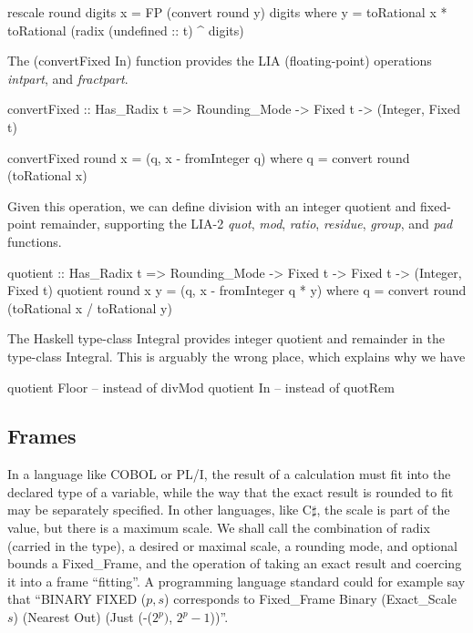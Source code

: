 \documentclass{article}
\begin{document}
\begin{code}
\begin{code}
rescale round digits x = FP (convert round y) digits
  where y = toRational x * toRational (radix (undefined :: t) ^ digits)
\end{code}

The (convertFixed In) function provides the
LIA (floating-point) operations {\it intpart}, and {\it fractpart}.

\begin{code}
convertFixed :: Has_Radix t =>
    Rounding_Mode -> Fixed t -> (Integer, Fixed t)

convertFixed round x = (q, x - fromInteger q)
  where q = convert round (toRational x)
\end{code}

Given this operation, we can define division with an
integer quotient and fixed-point remainder, supporting
the LIA-2 {\it quot}, {\it mod}, {\it ratio}, {\it residue},
{\it group}, and {\it pad} functions.

\begin{code}
quotient :: Has_Radix t =>
    Rounding_Mode -> Fixed t -> Fixed t ->
    (Integer, Fixed t)
quotient round x y = (q, x - fromInteger q * y)
  where q = convert round (toRational x / toRational y)
\end{code}

The Haskell type-class Integral provides integer quotient
and remainder in the type-class Integral.  This is arguably
the wrong place, which explains why we have
\begin{code}%
quotient Floor -- instead of divMod
quotient In    -- instead of quotRem
\end{code}

\subsection{Frames}

In a language like COBOL or PL/I, the result of a calculation
must fit into the declared type of a variable, while the way
that the exact result is rounded to fit may be separately
specified.  In other languages, like C$\sharp$, the scale is
part of the value, but there is a maximum scale.  We shall
call the combination of radix (carried in the type),
a desired or maximal scale, a rounding
mode, and optional bounds a Fixed\_Frame, and the operation
of taking an exact result and coercing it into a frame ``fitting''.
A programming language standard could for example say that
``BINARY FIXED ($p,s$) corresponds to
Fixed\_Frame Binary (Exact\_Scale $s$) (Nearest Out)
(Just (-($2^p)$, $2^p-1$))''.


\end{code}
\end{document}
